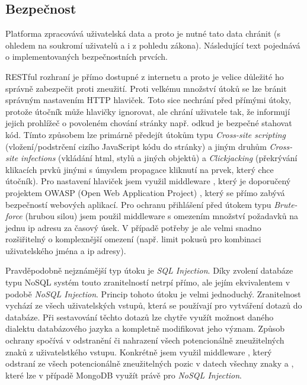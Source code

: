 \subsection{Bezpečnost}
Platforma zpracovává uživatelská data a proto je nutné tato data chránit (s ohledem na soukromí uživatelů a i z pohledu zákona). Následující text pojednává o implementovaných bezpečnostních prvcích.

RESTful rozhraní je přímo dostupné z internetu a proto je velice důležité ho správně zabezpečit proti zneužití. Proti velkému množství útoků se lze bránit správným nastavením HTTP hlaviček. Toto sice nechrání před přímými útoky, protože útočník může hlavičky ignorovat, ale chrání uživatele tak, že informují jejich prohlížeč o povoleném chování stránky např. odkud je bezpečné stahovat kód. Tímto způsobem lze primárně předejít útokům typu \textit{Cross-site scripting} (vložení/podstrčení cizího JavaScript kódu do stránky) a jiným druhům \textit{Cross-site infections} (vkládání html, stylů a jiných objektů) a \textit{Clickjacking} (překrývání klikacích prvků jinými s úmyslem propagace kliknutí na prvek, který chce útočník). Pro nastavení hlaviček jsem využil middleware , který je doporučený projektem OWASP (Open Web Application Project) \cite{owasp-cheatsheets}, který se přímo zabývá bezpečností webových aplikací. Pro ochranu přihlášení před útokem typu \textit{Brute-force} (hrubou silou) jsem použil middleware  s omezením množství požadavků na jednu ip adresu za časový úsek. V případě potřeby je ale velmi snadno rozšiřitelný o komplexnější omezení (např. limit pokusů pro kombinaci uživatelského jména a ip adresy).

Pravděpodobně nejznámější typ útoku je \textit{SQL Injection}. Díky zvolení databáze typu NoSQL systém touto zranitelností netrpí přímo, ale jejím ekvivalentem v podobě \textit{NoSQL Injection}. Princip tohoto útoku je velmi jednoduchý. Zranitelnost vychází ze všech uživatelských vstupů, která se používají pro vytváření dotazů do databáze. Při sestavování těchto dotazů lze chytře využít možnost daného dialektu databázového jazyka a kompletně modifikovat jeho význam. Způsob ochrany spočívá v odstranění či nahrazení všech potencionálně zneužitelných znaků z uživatelstkého vstupu. Konkrétně jsem využil middleware , který odstraní ze všech potencionálně zneužitelných pozic v datech všechny znaky \uv{\$} a , které lze v případě MongoDB využít právě pro \textit{NoSQL Injection}.

